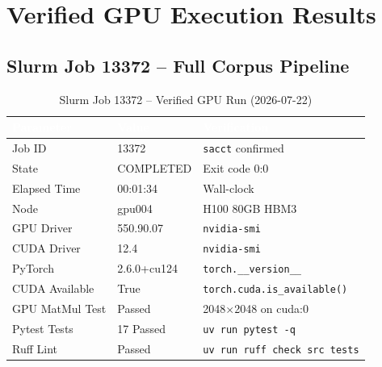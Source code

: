 \documentclass[11pt,a4paper]{article}
\begin{document}
\section{Verified GPU Execution Results}
\label{sec:gpu_results}

\subsection{Slurm Job 13372 -- Full Corpus Pipeline}
\begin{table}[H]
\centering
\caption{Slurm Job 13372 -- Verified GPU Run (2026-07-22)}
\label{tab:slurm_13372}
\begin{tabular}{>{\color{nvidiaText}}l >{\color{nvidiaText}}l >{\color{nvidiaText}}l}
\rowcolor{tableHeader}
\textcolor{white}{\textbf{Parameter}} & \textcolor{white}{\textbf{Value}} & \textcolor{white}{\textbf{Verification}} \\
\midrule
Job ID & 13372 & \texttt{sacct} confirmed \\
State & COMPLETED & Exit code 0:0 \\
Elapsed Time & 00:01:34 & Wall-clock \\
Node & gpu004 & H100 80GB HBM3 \\
GPU Driver & 550.90.07 & \texttt{nvidia-smi} \\
CUDA Driver & 12.4 & \texttt{nvidia-smi} \\
PyTorch & 2.6.0+cu124 & \texttt{torch.\_\_version\_\_} \\
CUDA Available & True & \texttt{torch.cuda.is\_available()} \\
GPU MatMul Test & Passed & 2048$\times$2048 on cuda:0 \\
Pytest Tests & 17 Passed & \texttt{uv run pytest -q} \\
Ruff Lint & Passed & \texttt{uv run ruff check src tests} \\
\bottomrule
\end{tabular}
\end{table}
\end{document}
